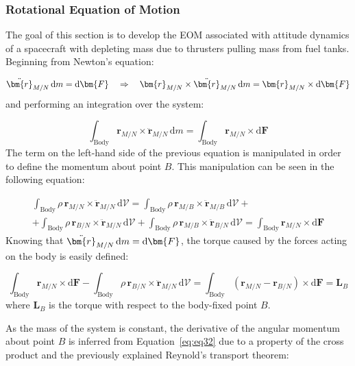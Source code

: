 \subsubsection{Rotational Equation of Motion}
The goal of this section is to develop the EOM associated with attitude dynamics of a spacecraft with depleting mass due to thrusters pulling mass from fuel tanks. Beginning from Newton's equation:

\begin{equation}
	\ddot{\bm{r}}_{M/N}\,\text{\text{d}}m=\text{d}\bm{F} \quad \Rightarrow \quad
	\bm{r}_{M/N} \times \ddot{\bm{r}}_{M/N}\,\text{d}m =\bm{r}_{M/N} \times \text{d}\bm{F}
\end{equation}
and performing an integration over the system:

\begin{equation}
	\int_{\text{Body}} \bm{r}_{M/N} \times \ddot{\bm{r}}_{M/N}\,\text{d}m = \int_{\text{Body}}\bm{r}_{M/N} \times \text{d}\bm{F}
\end{equation}
The term on the left-hand side of the previous equation is manipulated in order to define the momentum about point $B$. This manipulation can be seen in the following equation:

\begin{multline}\label{eq:eq32}
	\int_{\text{Body}} \rho\,\bm{r}_{M/N} \times \ddot{\bm{r}}_{M/N}\,\text{d}\mathcal{V} = \int_{\text{Body}} \rho\,\bm{r}_{M/B} \times \ddot{\bm{r}}_{M/B}\,\text{d}\mathcal{V} +\\ + \int_{\text{Body}} \rho\,\bm{r}_{B/N} \times \ddot{\bm{r}}_{M/N}\,\text{d}\mathcal{V} + \int_{\text{Body}} \rho\,\bm{r}_{M/B} \times \ddot{\bm{r}}_{B/N}\,\text{d}\mathcal{V} = \int_{\text{Body}}\bm{r}_{M/N} \times \text{d}\bm{F}
\end{multline}
Knowing that $\ddot{\bm{r}}_{M/N}\,\text{\text{d}}m=\text{d}\bm{F}$, the torque caused by the forces acting on the body is  easily defined:

\begin{equation}
	\int_{\text{Body}}\bm{r}_{M/N} \times \text{d}\bm{F}-\int_{\text{Body}}  \rho\,\bm{r}_{B/N} \times \ddot{\bm{r}}_{M/N}\,\text{d}\mathcal{V}
	= \int_{\text{Body}} \left(\bm{r}_{M/N}-\bm{r}_{B/N}\right) \times \text{d}\bm{F} = \bm{L}_{B}
\end{equation}
\noindent
where $\bm{L}_{B}$ is the torque with respect to the body-fixed point $B$.

As the mass of the system is constant, the derivative of the angular momentum about point $B$ is inferred from Equation~\eqref{eq:eq32} due to a property of the cross product and the previously explained Reynold's transport theorem:

